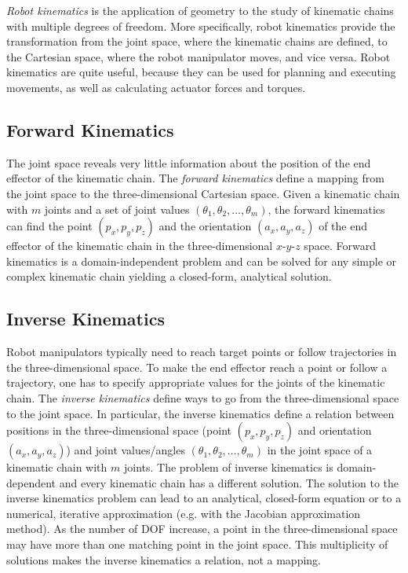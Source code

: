 \textit{Robot kinematics} is the application of geometry to the study of  kinematic chains with multiple degrees of freedom. More specifically, robot kinematics provide the transformation from the joint space, where the kinematic chains are defined, to the Cartesian space, where the robot manipulator moves, and vice versa. Robot kinematics are quite useful, because they can be used for planning and executing movements, as well as calculating actuator forces and torques.



\subsection{Forward Kinematics}
The joint space reveals very little information about the position of the end effector of the kinematic chain. The \textit{forward kinematics} define a mapping from the joint space to the three-dimensional Cartesian space. Given a kinematic chain with $m$ joints and a set of joint values $(\theta_1, \theta_2,\ldots,\theta_m)$, the forward kinematics can find the point $(p_x,p_y,p_z)$ and the orientation $(a_x,a_y,a_z)$ of the end effector of the kinematic chain in the three-dimensional $x$-$y$-$z$ space. Forward kinematics is a domain-independent problem and can be solved for any simple or complex kinematic chain yielding a closed-form, analytical solution. 

\subsection{Inverse Kinematics}
Robot manipulators typically need to reach target points or follow trajectories in the three-dimensional space. To make the end effector reach a point or follow a trajectory, one has to specify appropriate values for the joints of the kinematic chain. The \textit{inverse kinematics} define ways to go from the three-dimensional space to the joint space. In particular, the inverse kinematics define a relation between positions in the three-dimensional space (point $(p_x,p_y,p_z)$ and orientation $(a_x,a_y,a_z)$) and joint values/angles $(\theta_1, \theta_2,\ldots,\theta_m)$ in the joint space of a kinematic chain with $m$ joints. The problem of inverse kinematics is domain-dependent and every kinematic chain has a different solution. The solution to the inverse kinematics problem can lead to an analytical, closed-form equation or to a numerical, iterative approximation (e.g. with the Jacobian approximation method). As the number of DOF increase, a point in the three-dimensional space may have more than one matching point in the joint space. This multiplicity of solutions makes the inverse kinematics a relation, not a mapping.




